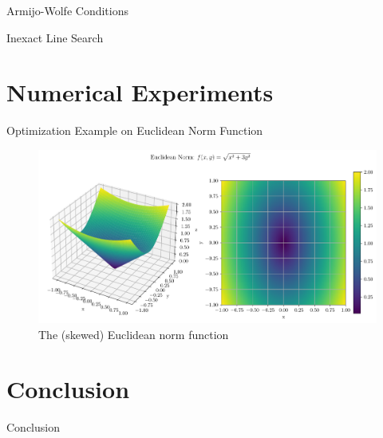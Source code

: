 \documentclass{beamer}
\begin{document}
\begin{frame}{Armijo-Wolfe Conditions}
\end{frame}

\begin{frame}{Inexact Line Search}
\end{frame}

\section{Numerical Experiments}
\begin{frame}{Optimization Example on Euclidean Norm Function}
    \begin{figure}
        \centering
        \includegraphics[width=1.0\textwidth]{plots/euclidean_norm.pdf}
        \caption{The (skewed) Euclidean norm function}
        \label{fig:euclidean_norm_function}
    \end{figure}
\end{frame}

\section{Conclusion}
\begin{frame}{Conclusion}
\end{frame}
\end{document}
